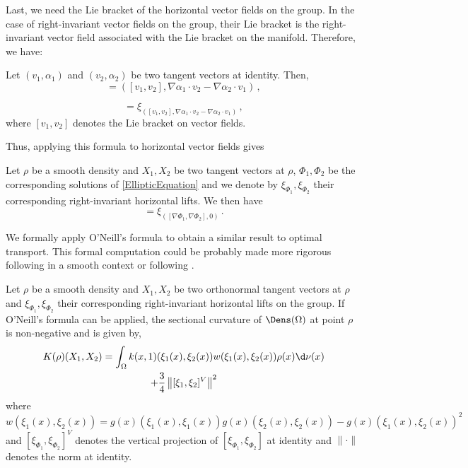 Last, we need the Lie bracket of the horizontal vector fields on the group. In the case of right-invariant vector fields on the group, their Lie bracket is the right-invariant vector field associated with the Lie bracket on the manifold. Therefore, we have:
\begin{proposition}
Let $(v_1,\alpha_1)$ and $(v_2,\alpha_2)$ be two tangent vectors at identity. Then,
 \begin{equation}
[(v_1,\alpha_1),(v_2,\alpha_2)] = \left( [v_1,v_2] , \nabla \alpha_1\cdot v_2 - \nabla \alpha_2\cdot v_1 \right)\,,
\end{equation}

 \begin{equation}
[\xi_{(v_1,\alpha_1)},\xi_{(v_2,\alpha_2)}] = \xi_{\left( [v_1,v_2] , \nabla \alpha_1\cdot v_2 - \nabla \alpha_2\cdot v_1 \right)}\,,
\end{equation}
where $ [v_1,v_2]$ denotes the Lie bracket on vector fields.
 \end{proposition}
Thus, applying this formula to horizontal vector fields gives
\begin{corollary}
Let $\rho$ be a smooth density and $X_1, X_2$ be two tangent vectors at $\rho$, $\Phi_1,\Phi_2$ be the corresponding solutions of \eqref{EllipticEquation} and we denote by $\xi_{\Phi_1},\xi_{\Phi_2}$ their corresponding right-invariant horizontal lifts. We then have
 \begin{equation}
[\xi_{(\nabla \Phi_1,\Phi_1)},\xi_{(\nabla \Phi_2,\Phi_2)}] = \xi_{\left( [\nabla \Phi_1,\nabla \Phi_2] ,0 \right)}\,.
\end{equation} 
\end{corollary}

We formally apply O'Neill's formula to obtain a similar result to optimal transport. This formal computation could be probably made more rigorous following \cite{lott2008some} in a smooth context or following \cite{UserGuideOT}.

\begin{proposition}\label{prop-curvature}
Let $\rho$ be a smooth density and $X_1, X_2$ be two orthonormal tangent vectors at $\rho$ and $\xi_{\Phi_1},\xi_{\Phi_2}$ their corresponding right-invariant horizontal lifts on the group.
If O'Neill's formula can be applied, the sectional curvature of $\Dens(\Omega)$ at point $\rho$ is non-negative and is given by, 
\begin{multline}\label{SectionalCurvatureONeill}
K(\rho)(X_1,X_2) = \int_\Omega k(x,1)(\xi_1(x),\xi_2(x)) w(\xi_1(x),\xi_2(x)) \rho(x) \d \nu(x) \\ + \frac 34 \left\| [\xi_1,\xi_2]^V \right\|^2
\end{multline}
where  
$$w(\xi_1(x),\xi_2(x)) = g(x)(\xi_1(x),\xi_1(x))g(x)(\xi_2(x),\xi_2(x))-g(x)(\xi_1(x),\xi_2(x))^2$$ and $ [\xi_{\Phi_1},\xi_{\Phi_2}]^V$ denotes the vertical projection of $[\xi_{\Phi_1},\xi_{\Phi_2}]$ at identity and $\| \cdot \|$ denotes the norm at identity.
\end{proposition}

